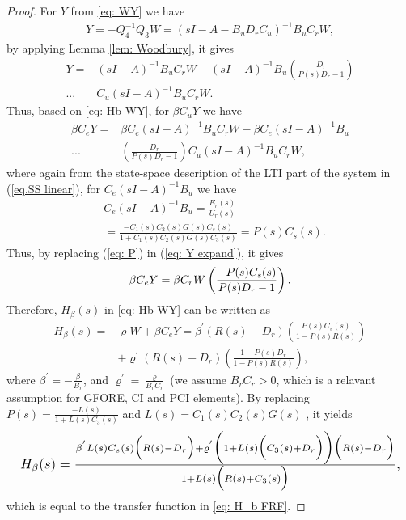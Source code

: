 \begin{proof}
For $Y$ from \eqref{eq: WY} we have 
\begin{equation}
\begin{split}
Y = -Q_4^{-1} Q_3 W = (sI - A - B_u D_r C_u)^{-1} B_u C_r W,
\end{split}
\end{equation}
by applying Lemma \ref{lem: Woodbury}, it gives
\begin{equation}
\begin{split}
Y =& (sI - A)^{-1} B_u C_r W - (sI - A)^{-1} B_u \left(\frac{D_r}{P(s) D_r - 1}\right)\\... &C_u (sI - A)^{-1} B_u C_r W.
\end{split}
\end{equation}
Thus, based on \eqref{eq: Hb WY}, for $\beta C_u Y$ we have
\begin{equation}
\begin{split}
\beta C_e Y =& \beta C_e (sI - A)^{-1} B_u C_r W - \beta C_e (sI - A)^{-1} B_u\\... &\left(\frac{D_r}{P(s) D_r - 1}\right) C_u (sI - A)^{-1} B_u C_r W,
\label{eq: Y expand}
\end{split}
\end{equation}
where again from the state-space description of the LTI part of the system in (\ref{eq.SS linear}), for $C_e (sI - A)^{-1} B_u$ we have
\begin{equation}
\begin{split}
&C_e (sI - A)^{-1} B_u = \frac{E_r(s)}{U_r(s)} \\ &= \frac{-C_1(s) C_2(s) G(s)C_s(s)}{1 + C_1(s) C_2(s) G(s) C_3(s)}=P(s)C_s(s).
\label{eq: PCs}
\end{split}
\end{equation}
Thus, by replacing (\ref{eq: P}) in (\ref{eq: Y expand}), it gives
\begin{equation}
\beta C_e Y = \beta C_r W \left(\frac{-P(s)C_s(s)}{P(s) D_r - 1}\right).\\
\end{equation}
Therefore, $H_\beta(s)$ in \eqref{eq: Hb WY} can be written as
\begin{equation}
\begin{split}
H_\beta(s)=&\varrho W + \beta C_e Y=\beta^{'} (R(s) - D_r)\left(\frac{P(s)C_s(s)}{1 - P(s) R(s)}\right) \\ &+\varrho^{'} (R(s) - D_r)\left(\frac{1 - P(s) D_r}{1 - P(s) R(s)}\right),
\label{eq: Hb semifinal}
\end{split}
\end{equation}
where $\beta^{'}=-\frac{\beta}{B_r}$, and $\varrho^{'}=\frac{\varrho}{B_rC_r}$ (we assume $B_rC_r>0$, which is a relavant assumption for GFORE, CI and PCI elements). By replacing $P(s)=\frac{-L(s)}{1 + L(s) C_3(s)}$ and $L(s)= C_1(s) C_2(s) G(s)$ , it yields
\begin{equation}
    \label{eq: H_b main}
    \resizebox{1\hsize}{!}{
    $H_\beta(s)=\frac{\beta^{'}L(s)C_s(s)\Big(R(s)-D_r\Big)+\varrho^{'}\bigg(1+L(s)\Big(C_3(s)+D_r\Big)\bigg)\Bigl(R(s)-D_r\Bigl)}{1+L(s)\Bigl(R(s)+C_3(s)\Bigl)},$
    }
    \end{equation}
which is equal to the transfer function in \eqref{eq: H_b FRF}.
\end{proof}

